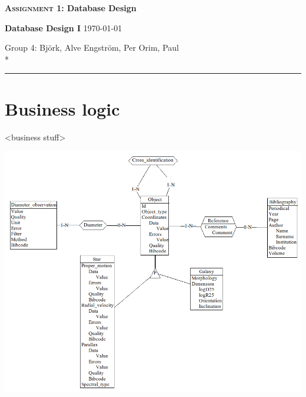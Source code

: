 \documentclass[a4paper, pagesize, parskip=half]{scrartcl}
\begin{document}
\Huge \textbf{\textsc{Assignment 1}: Database Design}

\Large \textbf{Database Design I} \quad \large \today

\normalsize Group 4: \quad Björk, Alve  \quad Engström, Per \quad Orim, Paul \\*
\rule{\textwidth}{1pt}

\bigskip

\section*{Business logic}

<business stuff>

\includegraphics[width=\textwidth]{diagram.png}
\end{document}
